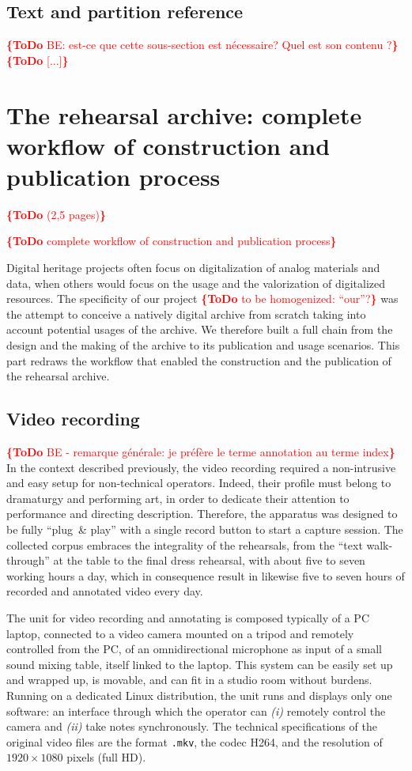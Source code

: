 \documentclass[conference]{IEEEtran}
\newcommand{\todo}[1]{\noindent\textcolor{red}{{\bf \{ToDo} #1{\bf \}}}}
\begin{document}
\subsection{Text and partition reference}
\todo{BE: est-ce que cette sous-section est nécessaire? Quel est son contenu ?}
\todo{[...]}


\section{The rehearsal archive: complete workflow of construction and publication process}
\label{sec:workflow}
\todo{(2,5 pages)}

\todo{complete workflow of construction and publication process}

Digital heritage projects often focus on digitalization of analog materials and data,
when others would focus on the usage and the valorization of digitalized resources.
The specificity of our project \todo{to be homogenized: ``our''?}
was the attempt to conceive a natively digital archive from scratch
taking into account potential usages of the archive.
We therefore built a full chain from the design and the making of the archive
to its publication and usage scenarios.
This part redraws the workflow that enabled the construction and the publication of the rehearsal archive.

\subsection{Video recording}
\todo{BE - remarque générale: je préfère le terme annotation au terme index}
In the context described previously, the video recording required a non-intrusive and easy setup for non-technical operators. Indeed, their profile must belong to dramaturgy and performing art, in order to dedicate their attention to performance and directing description. Therefore, the apparatus was designed to be fully ``plug\ \& play'' with a single record button to start a capture session.
The collected corpus embraces the integrality of the rehearsals, from the ``text walk-through'' at the table to the final dress rehearsal, with about five to seven working hours a day, which in consequence result in likewise five to seven hours of recorded and annotated video every day.

The unit for video recording and annotating is composed typically of a PC laptop, connected to a video camera mounted on a tripod and remotely controlled from the PC, of an omnidirectional microphone as input of a small sound mixing table, itself linked to the laptop. This system can be easily set up and wrapped up, is movable, and can fit in a studio room without burdens. Running on a dedicated Linux distribution, the unit runs and displays only one software: an interface through which the operator can \emph{(i)} remotely control the camera and \emph{(ii)} take notes synchronously. 
The technical specifications of the original video files are the format \texttt{.mkv}, the codec H264, and the resolution of $1920 \times 1080$ pixels (full HD).
\end{document}
